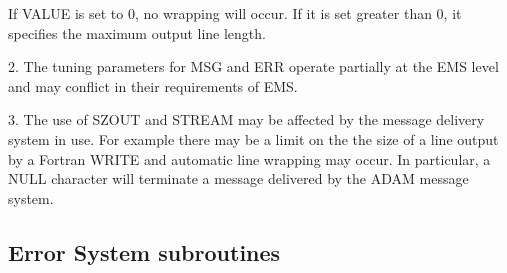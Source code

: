 \documentclass[twoside,11pt]{starlink}
\begin{document}
\begin {small}
{{{{         If VALUE is set to 0, no wrapping will occur. If it is set greater
         than 0, it specifies the maximum output line length.
      }
      }

      2. The tuning parameters for MSG and ERR operate partially at the EMS
         level and may conflict in their requirements of EMS.

      3. The use of SZOUT and STREAM may be affected by the message delivery
        system in use. For example there may be a limit on the the size of a
        line output by a Fortran WRITE and automatic line wrapping may occur.
        In particular, a NULL character will terminate a message delivered by
        the ADAM message system.
   }
}
\end {small}

\newpage
\subsection{Error System subroutines}
\end{document}
